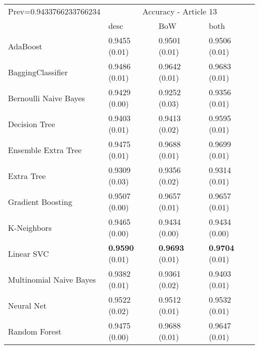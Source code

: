 \begin{tabular}{|l|l|l|l| }
\hline
Prev=0.9433766233766234 &  \multicolumn{3}{c|}{Accuracy - Article 13} \\
\cline{2-4} & desc & BoW & both \\ \hline
AdaBoost                & 0.9455 (0.01) & 0.9501 (0.01) & 0.9506 (0.01)\\
BaggingClassifier       & 0.9486 (0.01) & 0.9642 (0.01) & 0.9683 (0.01)\\
Bernoulli Naive Bayes   & 0.9429 (0.00) & 0.9252 (0.03) & 0.9356 (0.01)\\
Decision Tree           & 0.9403 (0.01) & 0.9413 (0.02) & 0.9595 (0.01)\\
Ensemble Extra Tree     & 0.9475 (0.01) & 0.9688 (0.01) & 0.9699 (0.01)\\
Extra Tree              & 0.9309 (0.03) & 0.9356 (0.02) & 0.9314 (0.01)\\
Gradient Boosting       & 0.9507 (0.00) & 0.9657 (0.01) & 0.9657 (0.01)\\
K-Neighbors             & 0.9465 (0.00) & 0.9434 (0.00) & 0.9434 (0.00)\\
Linear SVC              & {\bf 0.9590} (0.01) & {\bf 0.9693} (0.01) & {\bf 0.9704} (0.01)\\
Multinomial Naive Bayes & 0.9382 (0.01) & 0.9361 (0.02) & 0.9403 (0.01)\\
Neural Net              & 0.9522 (0.02) & 0.9512 (0.01) & 0.9532 (0.01)\\
Random Forest           & 0.9475 (0.00) & 0.9688 (0.01) & 0.9647 (0.01)\\
\hline
\end{tabular}